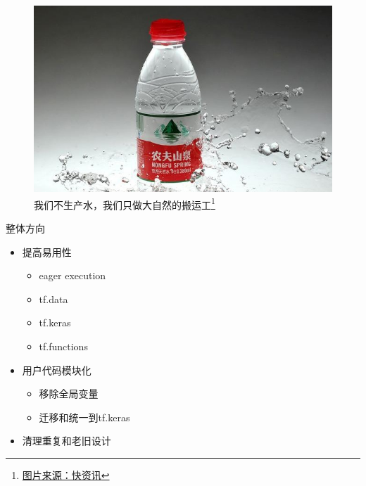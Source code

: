 





\createtitle

\begin{frame}
    \begin{figure}[!tb]
        \includegraphics[width=1.2\onepicwidth]{figure/water}
        \caption{我们不生产水，我们只做大自然的搬运工\footnote{
                 \href{http://sh.qihoo.com/pc/967ac7a2370f8fc79?sign=360_e39369d1}{图片来源：快资讯}}}
    \end{figure}
\end{frame}

\begin{frame}{整体方向}
    \begin{itemize}
        \item 提高易用性
            \begin{itemize}
                \item eager execution
                \item tf.data
                \item tf.keras
                \item tf.functions
            \end{itemize}
        \item 用户代码模块化
            \begin{itemize}
                \item 移除全局变量
                \item 迁移和统一到tf.keras
            \end{itemize}
        \item 清理重复和老旧设计
    \end{itemize}
\end{frame}

\createoutline



\createlastpage


